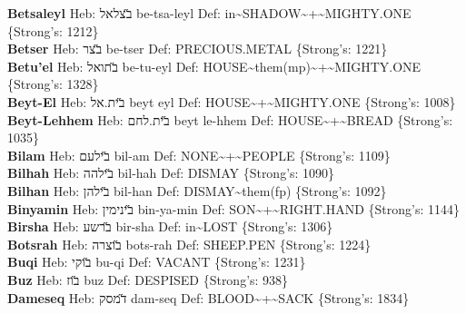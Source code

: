 {\textbf{Betsaleyl} Heb: {\large\H בצלאל} be-tsa-leyl Def: in\textasciitilde{}SHADOW\textasciitilde{}+\textasciitilde{}MIGHTY.ONE \{Strong's: 1212\}\hfill{}\\

\textbf{Betser} Heb: {\large\H בצר} be-tser Def: PRECIOUS.METAL \{Strong's: 1221\}\hfill{}\\

\textbf{Betu'el} Heb: {\large\H בתואל} be-tu-eyl Def: HOUSE\textasciitilde{}them(mp)\textasciitilde{}+\textasciitilde{}MIGHTY.ONE \{Strong's: 1328\}\hfill{}\\

\textbf{Beyt-El} Heb: {\large\H בית.אל} beyt eyl Def: HOUSE\textasciitilde{}+\textasciitilde{}MIGHTY.ONE \{Strong's: 1008\}\hfill{}\\

\textbf{Beyt-Lehhem} Heb: {\large\H בית.לחם} beyt le-hhem Def: HOUSE\textasciitilde{}+\textasciitilde{}BREAD \{Strong's: 1035\}\hfill{}\\

\textbf{Bilam} Heb: {\large\H בילעם} bil-am Def: NONE\textasciitilde{}+\textasciitilde{}PEOPLE \{Strong's: 1109\}\hfill{}\\

\textbf{Bilhah} Heb: {\large\H בילהה} bil-hah Def: DISMAY \{Strong's: 1090\}\hfill{}\\

\textbf{Bilhan} Heb: {\large\H בילהן} bil-han Def: DISMAY\textasciitilde{}them(fp) \{Strong's: 1092\}\hfill{}\\

\textbf{Binyamin} Heb: {\large\H בינימין} bin-ya-min Def: SON\textasciitilde{}+\textasciitilde{}RIGHT.HAND \{Strong's: 1144\}\hfill{}\\

\textbf{Birsha} Heb: {\large\H ברשע} bir-sha Def: in\textasciitilde{}LOST \{Strong's: 1306\}\hfill{}\\

\textbf{Botsrah} Heb: {\large\H בוצרה} bots-rah Def: SHEEP.PEN \{Strong's: 1224\}\hfill{}\\

\textbf{Buqi} Heb: {\large\H בוקי} bu-qi Def: VACANT \{Strong's: 1231\}\hfill{}\\

\textbf{Buz} Heb: {\large\H בוז} buz Def: DESPISED \{Strong's: 938\}\hfill{}\\

\textbf{Dameseq} Heb: {\large\H דמסק} dam-seq Def: BLOOD\textasciitilde{}+\textasciitilde{}SACK \{Strong's: 1834\}\hfill{}\\

}
